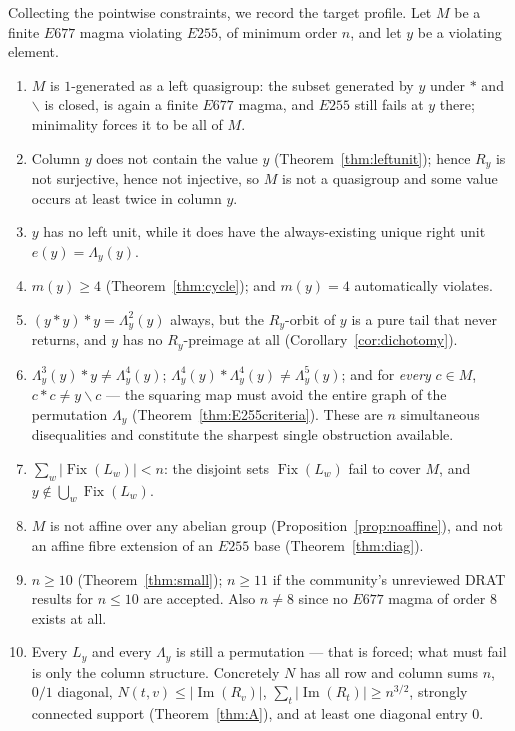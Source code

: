 \documentclass[11pt]{article}
\theoremstyle{plain}
\theoremstyle{definition}
\theoremstyle{remark}
\numberwithin{equation}{section}
\newcommand{\op}{\mathbin{*}}
\newcommand{\Fix}{\operatorname{Fix}}
\newcommand{\Imm}{\operatorname{Im}}
\begin{document}
Collecting the pointwise constraints, we record the target profile. Let $M$ be a finite $E677$
magma violating $E255$, of minimum order $n$, and let $y$ be a violating element.

\begin{enumerate}
\item $M$ is $1$-generated as a left quasigroup: the subset generated by $y$ under $\op$ and
$\backslash$ is closed, is again a finite $E677$ magma, and $E255$ still fails at $y$ there;
minimality forces it to be all of $M$.
\item Column $y$ does not contain the value $y$ (Theorem~\ref{thm:leftunit}); hence $R_y$ is
not surjective, hence not injective, so $M$ is not a quasigroup and some value occurs at least
twice in column $y$.
\item $y$ has no left unit, while it does have the always-existing unique right unit
$e(y) = \Lambda_y(y)$.
\item $m(y)\ge 4$ (Theorem~\ref{thm:cycle}); and $m(y)=4$ automatically violates.
\item $(y\op y)\op y = \Lambda_y^2(y)$ always, but the $R_y$-orbit of $y$ is a pure tail that
never returns, and $y$ has no $R_y$-preimage at all (Corollary~\ref{cor:dichotomy}).
\item $\Lambda_y^3(y)\op y \ne \Lambda_y^4(y)$; $\Lambda_y^4(y)\op\Lambda_y^4(y)\ne\Lambda_y^5(y)$;
and for \emph{every} $c\in M$, $c\op c\ne y\backslash c$ --- the squaring map must avoid the
entire graph of the permutation $\Lambda_y$ (Theorem~\ref{thm:E255criteria}). These are $n$
simultaneous disequalities and constitute the sharpest single obstruction available.
\item $\sum_w|\Fix(L_w)| < n$: the disjoint sets $\Fix(L_w)$ fail to cover $M$, and
$y\notin\bigcup_w\Fix(L_w)$.
\item $M$ is not affine over any abelian group (Proposition~\ref{prop:noaffine}), and not an
affine fibre extension of an $E255$ base (Theorem~\ref{thm:diag}).
\item $n\ge 10$ (Theorem~\ref{thm:small}); $n\ge11$ if the community's unreviewed DRAT results
for $n\le10$ are accepted. Also $n\ne 8$ since no $E677$ magma of order $8$ exists at all.
\item Every $L_y$ and every $\Lambda_y$ is still a permutation --- that is forced; what must
fail is only the column structure. Concretely $N$ has all row and column sums $n$, $0/1$
diagonal, $N(t,v)\le|\Imm(R_v)|$, $\sum_t|\Imm(R_t)|\ge n^{3/2}$, strongly connected support
(Theorem~\ref{thm:A}), and at least one diagonal entry $0$.
\end{enumerate}
\end{document}
